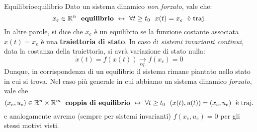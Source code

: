 \documentclass[a4paper]{report}
\begin{document}
\begin{defin}{Equilibrio}{equilibrio}
	Dato un sistema dinamico \textit{non forzato}, vale che:
	\begin{equation}
		x_e\in \R^n \ \ \textrm{\textbf{equilibrio}} \ \leftrightarrow \ \forall t \geq t_0 \ \ x(t)=x_e \ \ \textrm{è traj.}
	\end{equation}
	In altre parole, si dice che $x_e$ è un equilibrio se la funzione costante associata $x(t) = x_e$ è una \textbf{traiettoria di stato}. In caso di \textit{sistemi invarianti continui}, data la costanza della traiettoria, si avrà  variazione di stato nulla:
	\begin{equation*}
		\dot x(t) = f(x(t)) \xrightarrow[eq.]{}\boxed{f(x_e) = 0}
	\end{equation*}
	Dunque, in corrispondenza di un equilibrio il sistema rimane piantato nello stato in cui si trova.
	\bb
	Nel caso più generale in cui abbiamo un sistema dinamico \textit{forzato}, vale che
	\begin{equation}
			(x_e, u_e)\in \R^n \times \R^m \ \ \textrm{\textbf{coppia di equilibrio}} \ \leftrightarrow \ \forall t \geq t_0 \ \ (x(t), u(t))=(x_e, u_e) \ \ \textrm{è traj.}
	\end{equation}
	e analogamente avremo (sempre per sistemi invarianti) $\boxed{f(x_e,u_e) = 0}$ per gli stessi motivi visti.
\end{defin}
\end{document}
